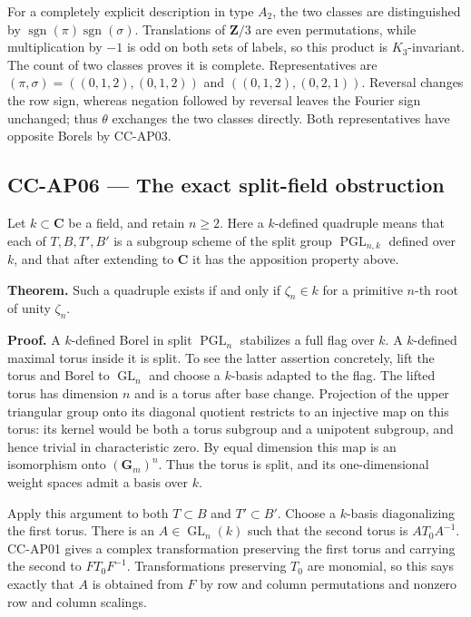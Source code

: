 \documentclass[11pt,a4paper]{article}
\theoremstyle{definition}\newtheorem{definition}[theorem]{Definition}
\theoremstyle{remark}\newtheorem{remark}[theorem]{Remark}
\begin{document}
For a completely explicit description in type \(A_2\), the two classes
are distinguished by
\(\operatorname{sgn}(\pi)\operatorname{sgn}(\sigma)\). Translations of
\(\mathbf Z/3\) are even permutations, while multiplication by \(-1\) is
odd on both sets of labels, so this product is \(K_3\)-invariant. The
count of two classes proves it is complete. Representatives are
\((\pi,\sigma)=((0,1,2),(0,1,2))\) and \(((0,1,2),(0,2,1))\). Reversal
changes the row sign, whereas negation followed by reversal leaves the
Fourier sign unchanged; thus \(\theta\) exchanges the two classes
directly. Both representatives have opposite Borels by CC-AP03.

\subsection{CC-AP06 --- The exact split-field
obstruction}\label{cc-ap06-the-exact-split-field-obstruction}

Let \(k\subset\mathbf C\) be a field, and retain \(n\geq2\). Here a
\(k\)-defined quadruple means that each of \(T,B,T',B'\) is a subgroup
scheme of the split group \(\operatorname{PGL}_{n,k}\) defined over
\(k\), and that after extending to \(\mathbf C\) it has the apposition
property above.

\textbf{Theorem.} Such a quadruple exists if and only if
\(\zeta_n\in k\) for a primitive \(n\)-th root of unity \(\zeta_n\).

\textbf{Proof.} A \(k\)-defined Borel in split \(\operatorname{PGL}_n\)
stabilizes a full flag over \(k\). A \(k\)-defined maximal torus inside
it is split. To see the latter assertion concretely, lift the torus and
Borel to \(\operatorname{GL}_n\) and choose a \(k\)-basis adapted to the
flag. The lifted torus has dimension \(n\) and is a torus after base
change. Projection of the upper triangular group onto its diagonal
quotient restricts to an injective map on this torus: its kernel would
be both a torus subgroup and a unipotent subgroup, and hence trivial in
characteristic zero. By equal dimension this map is an isomorphism onto
\((\mathbf G_m)^n\). Thus the torus is split, and its one-dimensional
weight spaces admit a basis over \(k\).

Apply this argument to both \(T\subset B\) and \(T'\subset B'\). Choose
a \(k\)-basis diagonalizing the first torus. There is an
\(A\in\operatorname{GL}_n(k)\) such that the second torus is
\(AT_0A^{-1}\). CC-AP01 gives a complex transformation preserving the
first torus and carrying the second to \(FT_0F^{-1}\). Transformations
preserving \(T_0\) are monomial, so this says exactly that \(A\) is
obtained from \(F\) by row and column permutations and nonzero row and
column scalings.
\end{document}
